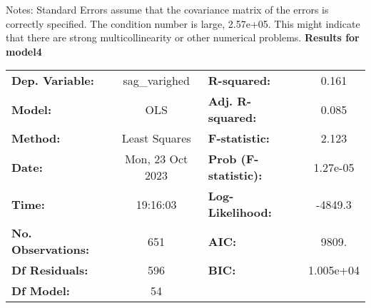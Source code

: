 Notes: \newline
 [1] Standard Errors assume that the covariance matrix of the errors is correctly specified. \newline
 [2] The condition number is large, 2.57e+05. This might indicate that there are \newline
 strong multicollinearity or other numerical problems.
\newpage 
\textbf{Results for model4} \\ 
\begin{center}
\begin{tabular}{lclc}
\toprule
\textbf{Dep. Variable:}                                                                                                        &  sag\_varighed   & \textbf{  R-squared:         } &     0.161   \\
\textbf{Model:}                                                                                                                &       OLS        & \textbf{  Adj. R-squared:    } &     0.085   \\
\textbf{Method:}                                                                                                               &  Least Squares   & \textbf{  F-statistic:       } &     2.123   \\
\textbf{Date:}                                                                                                                 & Mon, 23 Oct 2023 & \textbf{  Prob (F-statistic):} &  1.27e-05   \\
\textbf{Time:}                                                                                                                 &     19:16:03     & \textbf{  Log-Likelihood:    } &   -4849.3   \\
\textbf{No. Observations:}                                                                                                     &         651      & \textbf{  AIC:               } &     9809.   \\
\textbf{Df Residuals:}                                                                                                         &         596      & \textbf{  BIC:               } & 1.005e+04   \\
\textbf{Df Model:}                                                                                                             &          54      & \textbf{                     } &             \\
\bottomrule
\end{tabular}
\begin{tabular}{lcccccc}

\end{tabular}
\end{center}
